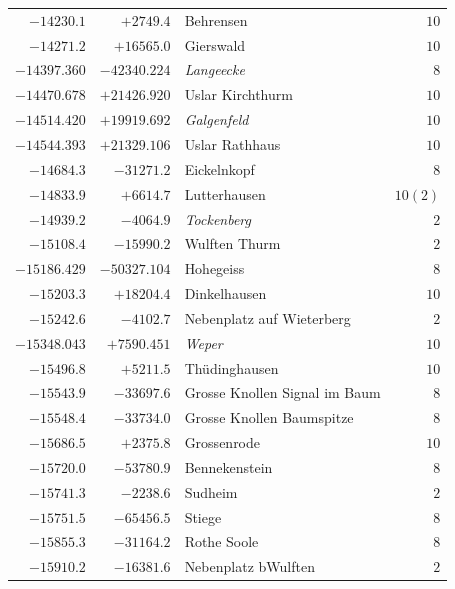 \begin{center}
\begin{tabular}{r|r|p{170pt}|r}
\(-14230.1\)&\(+2749.4\)&Behrensen&\(10\)\\
\(-14271.2\)&\(+16565.0\)&Gierswald&\(10\)\\
\(-14397.360\)&\(-42340.224\)&\textit{Langeecke}&\(8\)\\
\(-14470.678\)&\(+21426.920\)&Uslar Kirchthurm&\(10\)\\
\(-14514.420\)&\(+19919.692\)&\textit{Galgenfeld}&\(10\)\\
\(-14544.393\)&\(+21329.106\)&Uslar Rathhaus&\(10\)\\
\(-14684.3\)&\(-31271.2\)&Eickelnkopf&\(8\)\\
\(-14833.9\)&\(+6614.7\)&Lutterhausen&\(10 (2)\)\\
\(-14939.2\)&\(-4064.9\)&\textit{Tockenberg}&\(2\)\\
\(-15108.4\)&\(-15990.2\)&Wulften Thurm&\(2\)\\
\(-15186.429\)&\(-50327.104\)&Hohegeiss&\(8\)\\
\(-15203.3\)&\(+18204.4\)&Dinkelhausen&\(10\)\\
\(-15242.6\)&\(-4102.7\)&Nebenplatz auf Wieterberg&\(2\)\\
\(-15348.043\)&\(+7590.451\)&\textit{Weper}&\(10\)\\
\(-15496.8\)&\(+5211.5\)&Thüdinghausen&\(10\)\\
\(-15543.9\)&\(-33697.6\)&Grosse Knollen Signal im Baum&\(8\)\\
\(-15548.4\)&\(-33734.0\)&Grosse Knollen Baumspitze&\(8\)\\
\(-15686.5\)&\(+2375.8\)&Grossenrode&\(10\)\\
\(-15720.0\)&\(-53780.9\)&Bennekenstein&\(8\)\\
\(-15741.3\)&\(-2238.6\)&Sudheim&\(2\)\\
\(-15751.5\)&\(-65456.5\)&Stiege&\(8\)\\
\(-15855.3\)&\(-31164.2\)&Rothe Soole&\(8\)\\
\(-15910.2\)&\(-16381.6\)&Nebenplatz bWulften&\(2\)\\
\hline\end{tabular}\endgroup\end{center}
\clearpage
